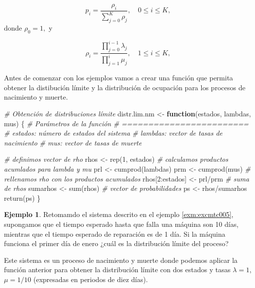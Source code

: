 \documentclass[
]{book}
\newenvironment{Shaded}{\begin{snugshade}}{\end{snugshade}}
\newcommand{\CommentTok}[1]{\textcolor[rgb]{0.56,0.35,0.01}{\textit{#1}}}
\newcommand{\ControlFlowTok}[1]{\textcolor[rgb]{0.13,0.29,0.53}{\textbf{#1}}}
\newcommand{\DecValTok}[1]{\textcolor[rgb]{0.00,0.00,0.81}{#1}}
\newcommand{\FunctionTok}[1]{\textcolor[rgb]{0.00,0.00,0.00}{#1}}
\newcommand{\NormalTok}[1]{#1}
\newcommand{\OtherTok}[1]{\textcolor[rgb]{0.56,0.35,0.01}{#1}}
\newcommand{\SpecialCharTok}[1]{\textcolor[rgb]{0.00,0.00,0.00}{#1}}
\theoremstyle{definition}
\theoremstyle{definition}
\newtheorem{example}{Ejemplo}[chapter]
\theoremstyle{definition}
\theoremstyle{definition}
\theoremstyle{remark}
\begin{document}
\[p_i = \frac{\rho_i}{\sum_{j = 0}^K \rho_j}, \quad 0 \leq i \leq K,\] donde \(\rho_0 = 1,\) y

\[\rho_i = \frac{\prod_{j=0}^{i-1}\lambda_j}{\prod_{j=1}^{i}\mu_j}, \quad 1 \leq i \leq K,\]

Antes de comenzar con los ejemplos vamos a crear una función que permita obtener la distibución límite y la distribución de ocupación para los procesos de nacimiento y muerte.

\begin{Shaded}
\begin{Highlighting}[]
\CommentTok{\# Obtención de distribuciones límite }
\NormalTok{distr.lim.nm }\OtherTok{\textless{}{-}} \ControlFlowTok{function}\NormalTok{(estados, lambdas, mus)}
\NormalTok{\{}
  \CommentTok{\# Parámetros de la función}
  \CommentTok{\# ========================}
  \CommentTok{\# estados: número de estados del sistema}
  \CommentTok{\# lambdas: vector de tasas de nacimiento}
  \CommentTok{\# mus: vector de tasas de muerte}
  
  \CommentTok{\# definimos vector de rho}
\NormalTok{  rhos }\OtherTok{\textless{}{-}} \FunctionTok{rep}\NormalTok{(}\DecValTok{1}\NormalTok{, estados)}
  \CommentTok{\# calculamos productos acumlados para lambda y mu}
\NormalTok{  prl }\OtherTok{\textless{}{-}} \FunctionTok{cumprod}\NormalTok{(lambdas)}
\NormalTok{  prm }\OtherTok{\textless{}{-}} \FunctionTok{cumprod}\NormalTok{(mus)}
  \CommentTok{\# rellenamos rho con los productos acumulados}
\NormalTok{  rhos[}\DecValTok{2}\SpecialCharTok{:}\NormalTok{estados] }\OtherTok{\textless{}{-}}\NormalTok{ prl}\SpecialCharTok{/}\NormalTok{prm}
  \CommentTok{\# suma de rhos}
\NormalTok{  sumarhos }\OtherTok{\textless{}{-}} \FunctionTok{sum}\NormalTok{(rhos)}
  \CommentTok{\# vector de probabilidades}
\NormalTok{  ps }\OtherTok{\textless{}{-}}\NormalTok{ rhos}\SpecialCharTok{/}\NormalTok{sumarhos}
  \FunctionTok{return}\NormalTok{(ps)}
\NormalTok{\}}
\end{Highlighting}
\end{Shaded}

\begin{example}
Retomamdo el sistema descrito en el ejemplo \ref{exm:excmtc005}, supongamos que el tiempo esperado hasta que falla una máquina son 10 días, mientras que el tiempo esperado de reparación es de 1 día. Si la máquina funciona el primer día de enero ¿cuál es la distribución límite del proceso?

Este sistema es un proceso de nacimiento y muerte donde podemos aplicar la función anterior para obtener la distribución límite con dos estados y tasas \(\lambda = 1\), \(\mu = 1/10\) (expresadas en periodos de diez días).
\end{example}
\end{document}
